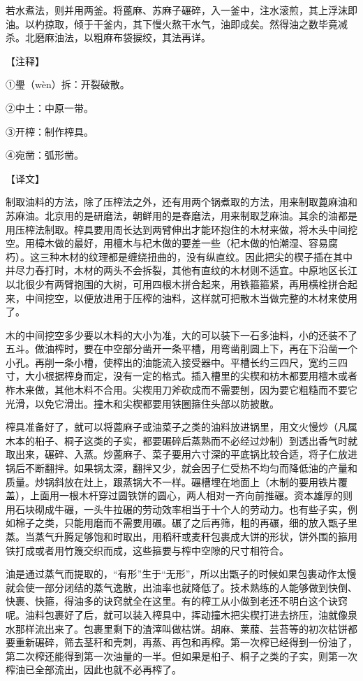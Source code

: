 \documentclass[12pt,UTF8]{ctexbook}
\begin{document}
若水煮法，则并用两釜。将蓖麻、苏麻子碾碎，入一釜中，注水滚煎，其上浮沫即油。以杓掠取，倾于干釜内，其下慢火熬干水气，油即成矣。然得油之数毕竟减杀。北磨麻油法，以粗麻布袋捩绞，其法再详。

【注释】

①璺（wèn）拆：开裂破散。

②中土：中原一带。

③开榨：制作榨具。

④宛凿：弧形凿。

【译文】

制取油料的方法，除了压榨法之外，还有用两个锅煮取的方法，用来制取蓖麻油和苏麻油。北京用的是研磨法，朝鲜用的是舂磨法，用来制取芝麻油。其余的油都是用压榨法制取。榨具要用周长达到两臂伸出才能环抱住的木材来做，将木头中间挖空。用樟木做的最好，用檀木与杞木做的要差一些（杞木做的怕潮湿、容易腐朽）。这三种木材的纹理都是缠绕扭曲的，没有纵直纹。因此把尖的楔子插在其中并尽力舂打时，木材的两头不会拆裂，其他有直纹的木材则不适宜。中原地区长江以北很少有两臂抱围的大树，可用四根木拼合起来，用铁箍箍紧，再用横栓拼合起来，中间挖空，以便放进用于压榨的油料，这样就可把散木当做完整的木材来使用了。

木的中间挖空多少要以木料的大小为准，大的可以装下一石多油料，小的还装不了五斗。做油榨时，要在中空部分凿开一条平槽，用弯凿削圆上下，再在下沿凿一个小孔。再削一条小槽，使榨出的油能流入接受器中。平槽长约三四尺，宽约三四寸，大小根据榨身而定，没有一定的格式。插入槽里的尖楔和枋木都要用檀木或者柞木来做，其他木料不合用。尖楔用刀斧砍成而不需要刨，因为要它粗糙而不要它光滑，以免它滑出。撞木和尖楔都要用铁圈箍住头部以防披散。

榨具准备好了，就可以将蓖麻子或油菜子之类的油料放进锅里，用文火慢炒（凡属木本的桕子、桐子这类的子实，都要碾碎后蒸熟而不必经过炒制）到透出香气时就取出来，碾碎、入蒸。炒蓖麻子、菜子要用六寸深的平底锅比较合适，将子仁放进锅后不断翻拌。如果锅太深，翻拌又少，就会因子仁受热不均匀而降低油的产量和质量。炒锅斜放在灶上，跟蒸锅大不一样。碾槽埋在地面上（木制的要用铁片覆盖），上面用一根木杆穿过圆铁饼的圆心，两人相对一齐向前推碾。资本雄厚的则用石块砌成牛碾，一头牛拉碾的劳动效率相当于十个人的劳动力。也有些子实，例如棉子之类，只能用磨而不需要用碾。碾了之后再筛，粗的再碾，细的放入甑子里蒸。当蒸气升腾足够饱和时取出，用稻秆或麦秆包裹成大饼的形状，饼外围的箍用铁打成或者用竹篾交织而成，这些箍要与榨中空隙的尺寸相符合。

油是通过蒸气而提取的，“有形”生于“无形”，所以出甑子的时候如果包裹动作太慢就会使一部分闭结的蒸气逸散，出油率也就降低了。技术熟练的人能够做到快倒、快裹、快箍，得油多的诀窍就全在这里。有的榨工从小做到老还不明白这个诀窍呢。油料包裹好了后，就可以装入榨具中，挥动撞木把尖楔打进去挤压，油就像泉水那样流出来了。包裹里剩下的渣滓叫做枯饼。胡麻、莱菔、芸苔等的初次枯饼都要重新碾碎，筛去茎秆和壳刺，再蒸、再包和再榨。第一次榨已经得到一份油了，第二次榨还能得到第一次油量的一半。但如果是桕子、桐子之类的子实，则第一次榨油已全部流出，因此也就不必再榨了。
\end{document}
